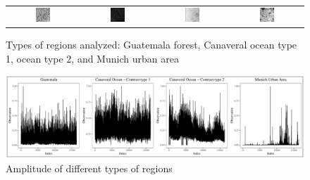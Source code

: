 \documentclass[journal]{IEEEtran}
\begin{document}
	\begin{figure}[hbt]
		\begin{tabular}{cccc}
			\includegraphics[width=0.22\textwidth]{Figures/guatemalaflorest.pdf} &   \includegraphics[width=0.22\textwidth]{Figures/Cape1.pdf} &
			\includegraphics[width=0.22\textwidth]{Figures/Cape2.pdf} &  \includegraphics[width=0.22\textwidth]{Figures/munichUrban.pdf} \\
		\end{tabular}
		\caption{Types of regions analyzed: Guatemala forest, Canaveral ocean type 1,
			ocean type 2, and Munich urban area}
		\label{fig:samples}
	\end{figure}
	
	\begin{figure}[hbt]
		\includegraphics[width=2\columnwidth]{Figures/SAR_TS.pdf}
		\caption{Amplitude of different types of regions}
		\label{fig:timeSeries}
	\end{figure}
	
\end{document}
